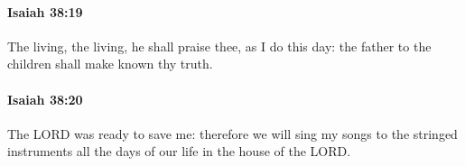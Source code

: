 		\paragraph{Isaiah 38:19} %
			\label{ISAIAH-38-19}

			The living, the living, he shall praise thee, as I do this day: the father to the children shall make known thy truth.


		\paragraph{Isaiah 38:20} %
			\label{ISAIAH-38-20}

			The LORD was ready to save me: therefore we will sing my songs to the stringed instruments all the days of our life in the house of the LORD.


